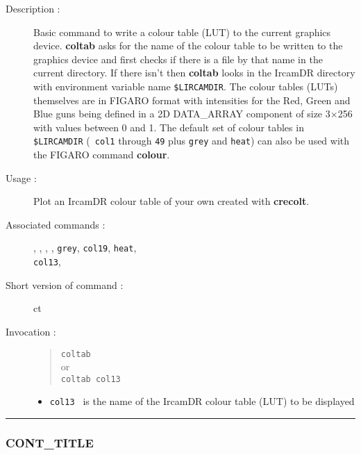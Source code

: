 \begin{description}

\item[Description :] Basic command to write a colour table (LUT) to the
current graphics device.  {\bf coltab} asks for the name of the colour table
to be written to the graphics device and first checks if there is a
file by that name in the current directory.  If there isn't then {\bf coltab}
looks in the {\sc IrcamDR} directory with environment variable name
{\tt \$LIRCAMDIR}. The colour tables (LUTs) themselves are in FIGARO
format with intensities for the Red, Green and Blue guns being defined
in a 2D DATA\_ARRAY component of size 3$\times$256 with values between
0 and 1.  The default set of colour tables in {\tt \$LIRCAMDIR} ({\tt
col1} through {\tt 49} plus {\tt grey} and {\tt heat}) can also be used
with the FIGARO command {\bf colour}.

\item[Usage :] Plot an {\sc IrcamDR} colour table of your own 
created with {\bf crecolt}.
\item[Associated commands :] {\tt {}}, 
{\tt {}}, {\tt {}}, 
{\tt {}}, {\tt grey}, {\tt col19}, {\tt heat}, \\ 
{\tt col13}, {\tt {}}
\item[Short version of command :] ct
\item[Invocation :]

\begin{quote}{\tt  coltab }\\
or \\
{\tt coltab col13 }
\end{quote}

\begin{itemize}

\item {\tt col13 } is the name of the {\sc IrcamDR} colour table (LUT) to be
displayed
\end{itemize}

\end{description}

\hrule 
\subsubsection*{\label{CONT_TITLE}CONT\_TITLE}

